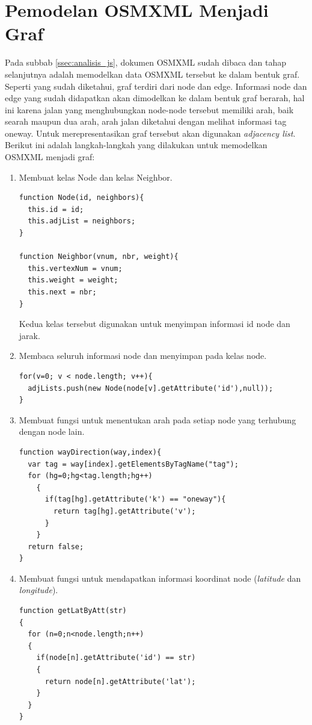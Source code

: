 \section{Pemodelan OSMXML Menjadi Graf} \label{ssec:analisis_graf}
Pada subbab \ref{ssec:analisis_js}, dokumen OSMXML sudah dibaca dan tahap
selanjutnya adalah memodelkan data OSMXML tersebut ke dalam bentuk graf. Seperti
yang sudah diketahui, graf terdiri dari node dan edge. Informasi node dan edge
yang sudah didapatkan akan dimodelkan ke dalam bentuk graf berarah, hal ini
karena jalan yang menghubungkan node-node tersebut memiliki arah, baik searah
maupun dua arah, arah jalan diketahui dengan melihat informasi tag oneway. Untuk
merepresentasikan graf tersebut akan digunakan \textit{adjacency list}. Berikut
ini adalah langkah-langkah yang dilakukan untuk memodelkan OSMXML menjadi graf:
\begin{enumerate}
  \item Membuat kelas Node dan kelas Neighbor.
\begin{verbatim}
function Node(id, neighbors){
  this.id = id;
  this.adjList = neighbors;
}

function Neighbor(vnum, nbr, weight){
  this.vertexNum = vnum;
  this.weight = weight;
  this.next = nbr;
}
\end{verbatim}
Kedua kelas tersebut digunakan untuk menyimpan informasi id node dan jarak.

  \item Membaca seluruh informasi node dan menyimpan pada kelas node.
\begin{verbatim}
for(v=0; v < node.length; v++){
  adjLists.push(new Node(node[v].getAttribute('id'),null));
}
\end{verbatim}

  \item Membuat fungsi untuk menentukan arah pada setiap node yang terhubung
  dengan node lain.
\begin{verbatim}
function wayDirection(way,index){
  var tag = way[index].getElementsByTagName("tag");
  for (hg=0;hg<tag.length;hg++)
    {
      if(tag[hg].getAttribute('k') == "oneway"){
        return tag[hg].getAttribute('v');
      }
    }
  return false;
}
\end{verbatim}

  \item Membuat fungsi untuk mendapatkan informasi koordinat node
  (\textit{latitude} dan \textit{longitude}).
\begin{verbatim}
function getLatByAtt(str)
{
  for (n=0;n<node.length;n++)
  {
    if(node[n].getAttribute('id') == str)
    {
      return node[n].getAttribute('lat');
    }
  }
}


\end{verbatim}
\end{enumerate}
